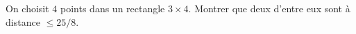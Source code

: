 On choisit $4$ points dans un rectangle $3 \times 4$. Montrer que deux d'entre eux sont à distance $\leq 25/8$.
